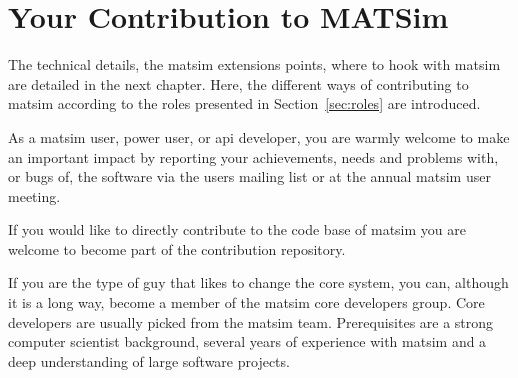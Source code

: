 
\section{Your Contribution to MATSim}
\label{sec:yourcontribution}
The technical details, \ie the \gls{matsim} extensions points, where to hook with \gls{matsim} are detailed in the next chapter. Here, the different ways of contributing to \gls{matsim} according to the roles presented in Section~\ref{sec:roles} are introduced.

As a \gls{matsim} user, power user, or \gls{api} developer, you are warmly welcome to make an important impact by reporting your achievements, needs and problems with, or bugs of, the software via the users mailing list or at the annual \gls{matsim} user meeting. 

If you would like to directly contribute to the code base of \gls{matsim} you are welcome to become part of the \gls{contribution} repository.

If you are the type of guy that likes to change the core system, you can, although it is a long way, become a member of the \gls{matsim} core developers group. Core developers are usually picked from the \gls{matsim} team. Prerequisites are a strong computer scientist background, several years of experience with \gls{matsim} and a deep understanding of large software projects.

